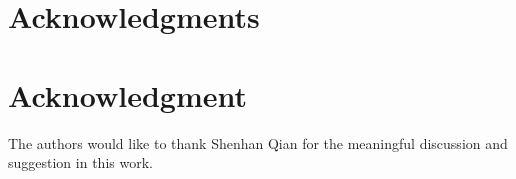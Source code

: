 \documentclass[10pt,journal,compsoc]{IEEEtran}
\begin{document}



\ifCLASSOPTIONcompsoc
\section*{Acknowledgments}
\else
\section*{Acknowledgment}
\fi


The authors would like to thank Shenhan Qian for the meaningful discussion and suggestion in this work.


\ifCLASSOPTIONcaptionsoff
\newpage
\fi




\end{document}
